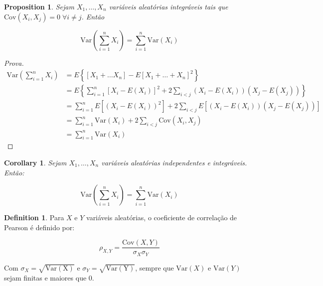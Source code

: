 \documentclass[
]{article}
\newtheorem{corollary}{Corollary}[section]
\newtheorem{proposition}{Proposition}[section]
\theoremstyle{definition}
\newtheorem{definition}{Definition}[section]
\theoremstyle{definition}
\theoremstyle{definition}
\theoremstyle{definition}
\theoremstyle{remark}
\begin{document}
\begin{proposition}
Sejam \(X_{1},\ldots,X_{n}\) variáveis aleatórias integráveis tais que \(\mathrm{Cov}(X_{i},X_{j}) = 0 \; \forall i \neq j\). Então

\begin{equation*}
\mathrm{Var}\left(\sum_{i=1}^{n}X_{i}\right) = \sum_{i=1}^{n}\mathrm{Var}(X_{i})
\end{equation*}
\end{proposition}

\begin{proof}[Prova]
\begin{align*}
\mathrm{Var}\left(\sum_{i=1}^{n}X_{i}\right) &= E\left\{[X_{1} + \ldots X_{n}] - E[X_{1} + \ldots + X_{n}]^{2}\right\} \\
&= E\left\{\sum_{i=1}^{n}[X_{i} - E(X_{i})]^{2} + 2 \sum_{i < j}(X_{i} - E(X_{i}))(X_{j} - E(X_{j}))\right\} \\
&= \sum_{i=1}^{n}E\left[(X_{i} - E(X_{i}))^{2}\right] + 2 \sum_{i < j}E[(X_{i} - E(X_{i}))(X_{j} - E(X_{j}))] \\
&= \sum_{i=1}^{n}\mathrm{Var}(X_{i}) + 2 \sum_{i < j}\mathrm{Cov}(X_{i},X_{j}) \\
&= \sum_{i=1}^{n}\mathrm{Var}(X_{i})
\end{align*}
\end{proof}

\begin{corollary}
Sejam \(X_{1},\ldots,X_{n}\) variáveis aleatórias independentes e integráveis. Então:

\begin{equation*}
\mathrm{Var}\left(\sum_{i=1}^{n}X_{i}\right) = \sum_{i=1}^{n}\mathrm{Var}(X_{i})
\end{equation*}
\end{corollary}

\begin{definition}
\protect\hypertarget{def:corrpearson}{}\label{def:corrpearson}Para \(X\) e \(Y\) variáveis aleatórias, o coeficiente de correlação de Pearson é definido por:

\begin{equation*}
\rho_{X,Y} = \frac{\mathrm{Cov}(X,Y)}{\sigma_{X}\sigma_{Y}}
\end{equation*}

Com \(\sigma_{X} = \sqrt{\mathrm{Var(X)}} \text{ e } \sigma_{Y} = \sqrt{\mathrm{Var(Y)}}\), sempre que \(\mathrm{Var}(X)\) e \(\mathrm{Var}(Y)\) sejam finitas e maiores que 0.
\end{definition}
\end{document}
